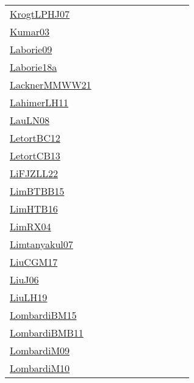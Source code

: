 {\begin{longtable}{p{3cm}p{4cm}p{2cm}p{2cm}p{2cm}p{2cm}p{2cm}p{2cm}p{2cm}p{2cm}}
\href{papers/KrogtLPHJ07.pdf}{KrogtLPHJ07}~\cite{KrogtLPHJ07} &  &  &  &  &  &  &  &  & \\
\href{papers/Kumar03.pdf}{Kumar03}~\cite{Kumar03} &  &  &  &  &  &  &  &  & \\
\href{papers/Laborie09.pdf}{Laborie09}~\cite{Laborie09} &  &  &  &  &  &  &  &  & \\
\href{papers/Laborie18a.pdf}{Laborie18a}~\cite{Laborie18a} &  &  &  &  &  &  &  &  & \\
\href{papers/LacknerMMWW21.pdf}{LacknerMMWW21}~\cite{LacknerMMWW21} &  &  &  &  &  &  &  &  & \\
\href{papers/LahimerLH11.pdf}{LahimerLH11}~\cite{LahimerLH11} &  &  &  &  &  &  &  &  & \\
\href{papers/LauLN08.pdf}{LauLN08}~\cite{LauLN08} &  &  &  &  &  &  &  &  & \\
\href{papers/LetortBC12.pdf}{LetortBC12}~\cite{LetortBC12} &  &  &  &  &  &  &  &  & \\
\href{papers/LetortCB13.pdf}{LetortCB13}~\cite{LetortCB13} &  &  &  &  &  &  &  &  & \\
\href{papers/LiFJZLL22.pdf}{LiFJZLL22}~\cite{LiFJZLL22} &  &  &  &  &  &  &  &  & \\
\href{papers/LimBTBB15.pdf}{LimBTBB15}~\cite{LimBTBB15} &  &  &  &  &  &  &  &  & \\
\href{papers/LimHTB16.pdf}{LimHTB16}~\cite{LimHTB16} &  &  &  &  &  &  &  &  & \\
\href{papers/LimRX04.pdf}{LimRX04}~\cite{LimRX04} &  &  &  &  &  &  &  &  & \\
\href{papers/Limtanyakul07.pdf}{Limtanyakul07}~\cite{Limtanyakul07} &  &  &  &  &  &  &  &  & \\
\href{papers/LiuCGM17.pdf}{LiuCGM17}~\cite{LiuCGM17} &  &  &  &  &  &  &  &  & \\
\href{papers/LiuJ06.pdf}{LiuJ06}~\cite{LiuJ06} &  &  &  &  &  &  &  &  & \\
\href{papers/LiuLH19.pdf}{LiuLH19}~\cite{LiuLH19} &  &  &  &  &  &  &  &  & \\
\href{papers/LombardiBM15.pdf}{LombardiBM15}~\cite{LombardiBM15} &  &  &  &  &  &  &  &  & \\
\href{papers/LombardiBMB11.pdf}{LombardiBMB11}~\cite{LombardiBMB11} &  &  &  &  &  &  &  &  & \\
\href{papers/LombardiM09.pdf}{LombardiM09}~\cite{LombardiM09} &  &  &  &  &  &  &  &  & \\
\href{papers/LombardiM10.pdf}{LombardiM10}~\cite{LombardiM10} &  &  &  &  &  &  &  &  & \\

\end{longtable}}
